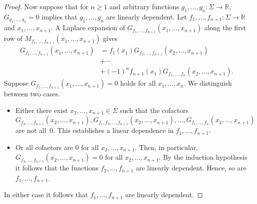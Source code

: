 \documentclass[a4paper,UKenglish,cleveref, autoref,mathscr]{lipics-v2019}
\newcommand{\RR}{\mathbb{R}}
\newcommand{\1}{\mathbbm{1}}
\begin{document}
\begin{proof}
	Now suppose that for $n \geq 1$ and arbitrary functions $g_1, \dots, g_n : \Sigma \rightarrow \RR$, $G_{g_1, \dots , g_n} = 0$ implies that $g_1, \dots, g_n$ are linearly dependent. Let $f_1, \dots, f_{n+1} : \Sigma \rightarrow \RR$ and $x_1, \dots, x_{n + 1}$. A Laplace expansion of $G_{f_1, \dots, f_{n+1}}(x_1, \dots, x_{n+1})$ along the first row of $M_{f_1, \dots, f_{n+1}}(x_1, \dots, x_{n+1})$ gives
	\begin{equation*}
	\begin{split}
	G_{f_1, \dots, f_{n+1}}(x_1, \dots, x_{n+1}) & = f_1(x_1) G_{f_2, \dots, f_{n+1}}(x_2, \dots, x_{n+1}) \\
	& +  \cdots \\
	& + (-1)^{n} f_{n+1}(x_1) G_{f_1, \dots, f_n}(x_2, \dots, x_{n+1}).
	\end{split}
	\end{equation*}
	Suppose $G_{f_1, \dots, f_{n+1}}(x_1, \dots, x_{n+1}) = 0$ holds for all $x_1, \dots, x_n$.
	We distinguish between two cases.
	\begin{itemize}
		\item Either there exist $x_2, \dots, x_{n+1} \in \Sigma$ such that the cofactors \[G_{f_2, \dots, f_{n+1}}(x_2, \dots, x_{n+1}), G_{f_1, f_3, \dots, f_{n+1}}(x_2, \dots, x_{n+1}), \dots, G_{f_1, \dots, f_n}(x_2, \dots, x_{n+1})\] are not all~$0$.
		This establishes a linear dependence in $f_1, \dots, f_{n+1}$.
		\item Or all cofactors are $0$ for all $x_2, \dots, x_{n+1}$.
		Then, in particular, $G_{f_2, \dots, f_{n+1}}(x_2, \dots, x_{n+1}) = 0$ for all $x_2, \dots, x_{n+1}$.
		By the induction hypothesis it follows that the functions $f_2, \dots, f_{n+1}$ are linearly dependent.
		Hence, so are $f_1, \dots, f_{n+1}$.
	\end{itemize}
	In either case it follows that $f_1, \dots, f_{n+1}$ are linearly dependent.
\end{proof}

\linindepofcommonfuncs*
\end{document}
